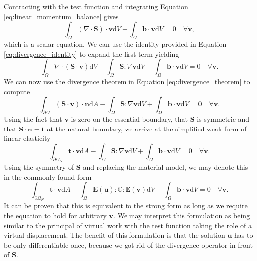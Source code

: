 Contracting with the test function and integrating Equation \eqref{eq:linear_momentum_balance} gives
\begin{equation}
    \int_\Omega (\nabla \cdot \mathbf{S}) \cdot \mathbf{v} \text{d}V
    + \int_\Omega \mathbf{b} \cdot \mathbf{v} \text{d}V = 0 \quad \forall \mathbf{v},
    \label{eq:weak_form_raw}
\end{equation}
which is a scalar equation. We can use the identity provided in Equation \eqref{eq:divergence_identity} to expand the first term yielding
\begin{equation}
    \int_\Omega \nabla \cdot (\mathbf{S} \cdot \mathbf{v}) \text{d}V
    - \int_\Omega \mathbf{S} : \nabla \mathbf{v} \text{d}V
    + \int_\Omega \mathbf{b} \cdot \mathbf{v} \text{d}V = 0 \quad \forall \mathbf{v}.
\end{equation}
We can now use the divergence theorem in Equation \eqref{eq:divergence_theorem} to compute 
\begin{equation}
    \int_{\partial \Omega} (\mathbf{S} \cdot \mathbf{v}) \cdot \mathbf{n} \text{d}A
    - \int_\Omega \mathbf{S} : \nabla \mathbf{v} \text{d}V
    + \int_\Omega \mathbf{b} \cdot \mathbf{v} \text{d}V = \mathbf{0} \quad \forall \mathbf{v}.
\end{equation}
Using the fact that $\mathbf{v}$ is zero on the essential boundary, that $\mathbf{S}$ is symmetric and that $\mathbf{S}\cdot \mathbf{n} = \mathbf{t}$ at the natural boundary, we arrive at the simplified weak form of linear elasticity 
\begin{equation}
    \int_{\partial \Omega_N} \mathbf{t} \cdot \mathbf{v} \text{d}A
    - \int_\Omega \mathbf{S} : \nabla \mathbf{v} \text{d}V
    + \int_\Omega \mathbf{b} \cdot \mathbf{v} \text{d}V = 0 \quad \forall \mathbf{v}.
\end{equation}
Using the symmetry of $\mathbf{S}$ and replacing the material model, we may denote this in the commonly found form
\begin{equation}
    \int_{\partial \Omega_N} \mathbf{t} \cdot \mathbf{v} \text{d}A
    - \int_\Omega \mathbf{E}(\mathbf{u}) : \mathbb{C} :  \mathbf{E}(\mathbf{v}) \text{d}V
    + \int_\Omega \mathbf{b} \cdot \mathbf{v} \text{d}V = 0 \quad \forall \mathbf{v}.
\end{equation}
It can be proven that this is equivalent to the strong form as long as we require the equation to hold for arbitrary $\mathbf{v}$. We may interpret this formulation as being similar to the principal of virtual work with the test function taking the role of a virtual displacement.
The benefit of this formulation is that the solution $\mathbf{u}$ has to be only differentiable once, because we got rid of the divergence operator in front of $\mathbf{S}$.

